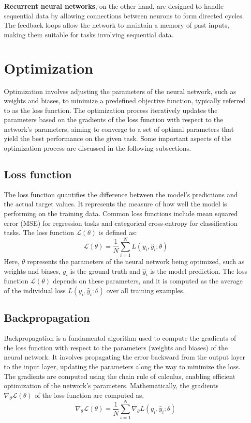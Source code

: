 \textbf{Recurrent neural networks}, on the other hand, are designed to handle sequential data by allowing connections between neurons to form directed cycles. The feedback loops allow the network to maintain a memory of past inputs, making them suitable for tasks involving sequential data.
\section{Optimization}
Optimization involves adjusting the parameters of the neural network, such as weights and biases, to minimize a predefined objective function, typically referred to as the loss function. The optimization process iteratively updates the parameters based on the gradients of the loss function with respect to the network's parameters, aiming to converge to a set of optimal parameters that yield the best performance on the given task. Some important aspects of the optimization process are discussed in the following subsections. 
\subsection{Loss function}
The loss function quantifies the difference between the model's predictions and the actual target values. It represents the measure of how well the model is performing on the training data. Common loss functions include mean squared error (MSE) for regression tasks and categorical cross-entropy for classification tasks. The loss function $\mathcal{L}(\theta)$ is defined as: 
\begin{equation}
    \mathcal{L}(\theta)=\frac{1}{N} \sum_{i=1}^N L\left(y_i, \hat{y}_i ; \theta\right)
    \end{equation}
Here, $\theta$ represents the parameters of the neural network being optimized, such as weights and biases, $y_i$ is the ground truth and $\hat{y}_i $ is the model prediction. The loss function $\mathcal{L}(\theta)$ depends on these parameters, and it is computed as the average of the individual loss $L\left(y_i, \hat{y}_i ; \theta\right)$ over all training examples.
\subsection{Backpropagation}
Backpropagation is a fundamental algorithm used to compute the gradients of the loss function with respect to the parameters (weights and biases) of the neural network. It involves propagating the error backward from the output layer to the input layer, updating the parameters along the way to minimize the loss. The gradients are computed using the chain rule of calculus, enabling efficient optimization of the network's parameters. Mathematically, the gradients $\nabla_\theta \mathcal{L}(\theta)$ of the loss function are computed as,
\begin{equation}
    \nabla_\theta \mathcal{L}(\theta)=\frac{1}{N} \sum_{i=1}^N \nabla_\theta L\left(y_i, \hat{y}_i ; \theta\right)
    \end{equation}
